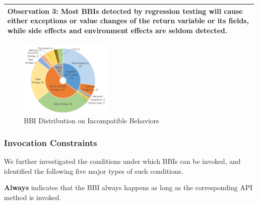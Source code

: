 \medskip\vspace{+0.05cm}
\noindent\begin{tabular}{|p{16cm}|}
	\hline
	\textbf{Observation 3:} Most BBIs detected by regression testing will cause either exceptions or value changes of the return variable or its fields, while side effects and environment effects are seldom detected.\\
	\hline
\end{tabular}
\medskip


%
\begin{figure}
	\centering
	\includegraphics[width=0.4\textwidth]{backward/figs/Behavior.pdf}
	\caption{BBI Distribution on Incompatible Behaviors}
	\label{figure:behavior}
	\vspace{0.3cm}
\end{figure}

\subsubsection{Invocation Constraints}

We further investigated the conditions under which BBIs can be invoked, and identified the following five major types of such conditions. 

\textbf{Always} indicates that the BBI always happens as long as the corresponding API method is invoked.



